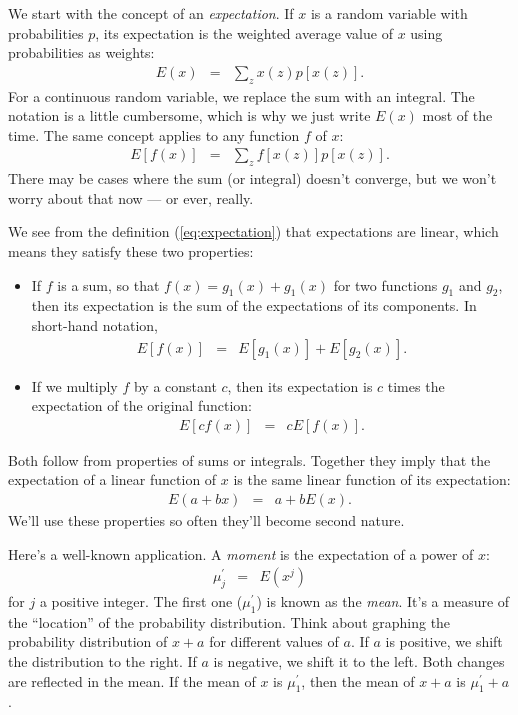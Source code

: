 \documentclass[11pt]{article}
\begin{document}
We start with the concept of an {\it expectation\/}.
If $x$ is a random variable with probabilities $p$,
its expectation is the weighted average value of $x$
using probabilities as weights:
\begin{eqnarray*}
    E (x) &=& \sum_z x(z) p[x(z)]  .
\end{eqnarray*}
For a continuous random variable,
we replace the sum with an integral.
The notation is a little cumbersome, which is why
we just write $E(x)$ most of the time.
The same concept applies to any function $f$ of $x$:
\begin{eqnarray}
    E [f(x)] &=& \sum_z  f[x(z)] p[x(z)] .
    \label{eq:expectation}
\end{eqnarray}
There may be cases where the sum (or integral) doesn't converge,
but we won't worry about that now --- or ever, really.

We see from the definition (\ref{eq:expectation}) that expectations are linear,
which means they satisfy these two properties:
\begin{itemize}
\item If $f$ is a sum, so that $f(x) = g_1(x) + g_1(x)$ for two functions $g_1$ and $g_2$,
then its expectation is the sum of the expectations of its components.
In short-hand notation,
\begin{eqnarray*}
    E[f(x)] &=& E[g_1(x)] + E[g_2(x)] .
\end{eqnarray*}
\item If we multiply $f$ by a constant $c$, then its expectation is $c$ times
the expectation of the original function:
\begin{eqnarray*}
    E[cf(x)] &=& c E[f(x)] .
\end{eqnarray*}
\end{itemize}
Both follow from properties of sums or integrals.
Together they imply that the expectation of a linear function of $x$
is the same linear function of its expectation:
\begin{eqnarray*}
    E(a + bx) &=& a + b E(x) .
\end{eqnarray*}
We'll use these properties so often they'll become second nature.


Here's a well-known application.
A {\it moment\/} is the expectation of a power of $x$:
\begin{eqnarray*}
    \mu_j^\prime &=& E (x^j)
\end{eqnarray*}
for $j$ a positive integer.
The first one ($\mu_1^\prime$) is known as the {\it mean\/}.
It's a measure of the ``location'' of the probability distribution.
Think about graphing the probability distribution
of $x+a$ for different values of $a$.
If $a$ is positive, we shift the distribution to the right.
If $a$ is negative, we shift it to the left.
Both changes are reflected in the mean.
If the mean of $x$ is $\mu^\prime_1$, then the mean of $x+a$ is
$\mu^\prime_1 + a$.
\end{document}
